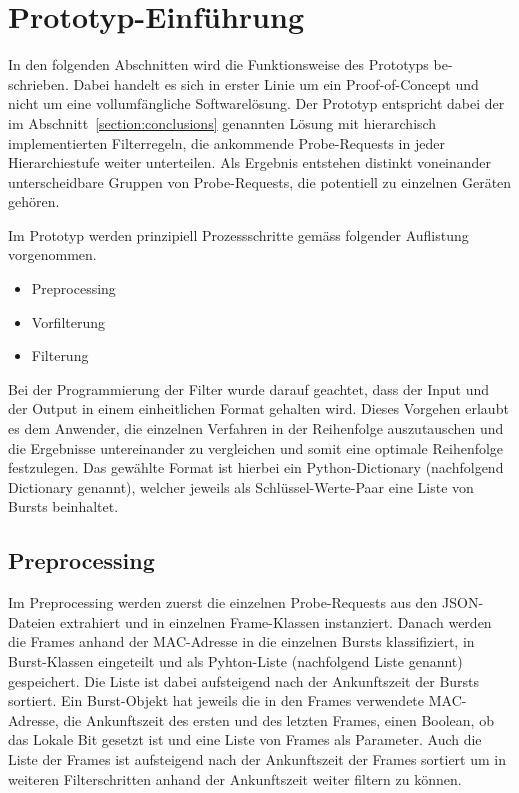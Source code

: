 \section{Prototyp-Einführung}
In den folgenden Abschnitten wird die Funktionsweise des Prototyps be-schrieben.
Dabei handelt es sich in erster Linie um ein Proof-of-Concept und nicht um eine 
vollumfängliche Softwarelösung. 
Der Prototyp entspricht dabei der im Abschnitt~\ref{section:conclusions} genannten
Lösung mit hierarchisch implementierten Filterregeln, die ankommende Probe-Requests 
in jeder Hierarchiestufe weiter unterteilen. Als Ergebnis entstehen distinkt 
voneinander unterscheidbare Gruppen von Probe-Requests, die potentiell zu einzelnen 
Geräten gehören.

Im Prototyp werden prinzipiell Prozessschritte gemäss folgender Auflistung vorgenommen.
\begin{itemize}
    \item Preprocessing
    \item Vorfilterung
    \item Filterung
\end{itemize}

Bei der Programmierung der Filter wurde darauf geachtet, dass der Input und der Output 
in einem einheitlichen Format gehalten wird. Dieses Vorgehen erlaubt es dem Anwender,
die einzelnen Verfahren in der Reihenfolge auszutauschen und die Ergebnisse untereinander
zu vergleichen und somit eine optimale Reihenfolge festzulegen.
Das gewählte Format ist hierbei ein Python-Dictionary (nachfolgend Dictionary genannt), 
welcher jeweils als Schlüssel-Werte-Paar eine Liste von Bursts beinhaltet.


\subsection{Preprocessing}
Im Preprocessing werden zuerst die einzelnen Probe-Requests aus den JSON-Dateien 
extrahiert und in einzelnen Frame-Klassen instanziert.
Danach werden die Frames anhand der MAC-Adresse in die einzelnen Bursts klassifiziert, 
in Burst-Klassen eingeteilt und als Pyhton-Liste (nachfolgend Liste genannt) gespeichert. 
Die Liste ist dabei aufsteigend nach der Ankunftszeit der Bursts sortiert.
Ein Burst-Objekt hat jeweils die in den Frames verwendete MAC-Adresse, 
die Ankunftszeit des ersten und des letzten Frames, einen Boolean, 
ob das Lokale Bit gesetzt ist und eine Liste von Frames als 
Parameter. Auch die Liste der Frames ist aufsteigend nach der Ankunftszeit der Frames 
sortiert um in weiteren Filterschritten anhand der Ankunftszeit weiter filtern zu können.

